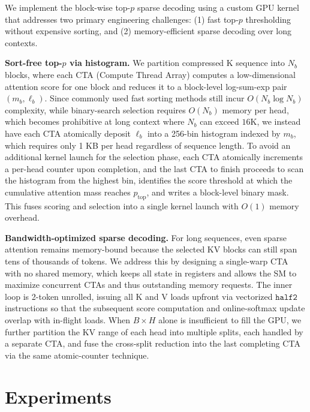 \documentclass{llmxive}
\providecommand{\zyk}[1]{zyk: #1}
\begin{document}
We implement the block-wise top-$p$ sparse decoding using a custom GPU kernel that addresses two primary engineering challenges: (1) fast top-$p$ thresholding without expensive sorting, and (2) memory-efficient sparse decoding over long contexts.

\noindent\textbf{Sort-free top-\texorpdfstring{$p$}{p} via histogram.} 
We partition compressed K sequence into $N_b$ blocks, where each CTA (Compute Thread Array) computes a low-dimensional attention score for one block and reduces it to a block-level log-sum-exp pair $(m_b, \ell_b)$.
Since commonly used fast sorting methods still incur $O(N_b \log N_b)$ complexity, while binary-search selection requires $O(N_b)$ memory per head, which becomes prohibitive at long context where $N_b$ can exceed $16\text{K}$, we instead have each CTA atomically deposit $\ell_b$ into a 256-bin histogram indexed by $m_b$, which requires only 1 KB per head regardless of sequence length.
To avoid an additional kernel launch for the selection phase, each CTA atomically increments a per-head counter upon completion, and the last CTA to finish proceeds to scan the histogram from the highest bin, identifies the score threshold at which the cumulative attention mass reaches $p_\text{top}$, and writes a block-level binary mask.
This fuses scoring and selection into a single kernel launch with $O(1)$ memory overhead.


\noindent\textbf{Bandwidth-optimized sparse decoding.} 
For long sequences, even sparse attention remains memory-bound because the selected KV blocks can still span tens of thousands of tokens. We address this by designing a single-warp CTA with no shared memory, which keeps all state in registers and allows the SM to maximize concurrent CTAs and thus outstanding memory requests.
The inner loop is 2-token unrolled, issuing all K and V loads upfront via vectorized $\texttt{half2}$ instructions so that the subsequent score computation and online-softmax update overlap with in-flight loads.
When $B{\times}H$ alone is insufficient to fill the GPU, we further partition the KV range of each head into multiple splits, each handled by a separate CTA, and fuse the cross-split reduction into the last completing CTA via the same atomic-counter technique.



\section{Experiments}
\end{document}

